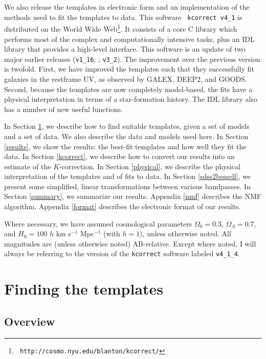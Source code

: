 \documentclass[10pt,preprint]{aastex}
\begin{document}
We also release the templates in electronic form and an implementation
of the methods used to fit the templates to data. This software {\tt
kcorrect v4\_1} is distributed on the World Wide Web{\footnote {\tt
http://cosmo.nyu.edu/blanton/kcorrect/}}. It consists of a core C
library which performs most of the complex and computationally
intensive tasks, plus an IDL library that provides a high-level
interface.  This software is an update of two major earlier releases
({\tt v1\_16}; \citealt{blanton03b}; {\tt v3\_2}). The improvement
over the previous version is twofold. First, we have improved the
templates such that they successfully fit galaxies in the restframe
UV, as observed by GALEX, DEEP2, and GOODS. Second, because the
templates are now completely model-based, the fits have a physical
interpretation in terms of a star-formation history. The IDL library
also has a number of new useful functions.

In Section \ref{algorithm}, we describe how to find suitable
templates, given a set of models and a set of data. We also describe
the data and models used here. In Section \ref{results}, we show the
results: the best-fit templates and how well they fit the data.  In
Section \ref{kcorrect}, we describe how to convert our results into an
estimate of the $K$-correction. In Section \ref{physical}, we describe
the physical interpretation of the templates and of fits to data.  In
Section \ref{sdss2bessell}, we present some simplified, linear
transformations between various bandpasses. In Section \ref{summary},
we summarize our results. Appendix \ref{nmf} describes the NMF
algorithm.  Appendix \ref{format} describes the electronic format of
our results.

Where necessary, we have assumed cosmological parameters $\Omega_0 =
0.3$, $\Omega_\Lambda = 0.7$, and $H_0 = 100$ $h$ km s$^{-1}$
Mpc$^{-1}$ (with $h=1$), unless otherwise noted. All magnitudes are
(unless otherwise noted) AB-relative.  Except where noted, I will
always be referring to the version of the {\tt kcorrect} software
labeled {\tt v4\_1\_4}.

\section{Finding the templates}
\label{algorithm}

\subsection{Overview}
\end{document}

